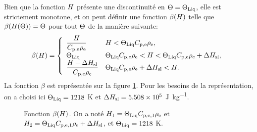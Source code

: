 Bien que la fonction $H$ présente une discontinuité en
$\Theta = \Theta_\text{Liq}$, elle est strictement monotone, et on peut
définir une fonction $\beta(H)$ telle que
$\beta(H(\Theta)) = \Theta$ pour tout
$\Theta$ de la manière suivante:
\begin{equation}\label{eq:beta}
  \beta(\enthalpy) = \left\{
  \begin{array}{ll}
    \displaystyle\frac{\enthalpy}{\electrolytehc\electrolytedensity} %
      & \enthalpy < \tliq \electrolytehc\electrolytedensity,\\
    \tliq %
      & \tliq \electrolytehc\electrolytedensity < \enthalpy < \tliq \electrolytehc\electrolytedensity + \fusionenthalpy,\\
    \displaystyle\frac{\enthalpy - \fusionenthalpy}{\electrolytehc\electrolytedensity} %
      & \tliq\electrolytehc\electrolytedensity + \fusionenthalpy < \enthalpy.\\
  \end{array}
  \right.
\end{equation}
La fonction $\beta$ est représentée sur la figure \ref{fig:beta}. Pour
les besoins de la représentation, on a choisi ici $\Theta_\text{Liq} =
\num{1218}$ \si{\kelvin} et $\Delta H_\mathrm{sl} = \num{5.508e5}$ \si{\joule\per\kilo\gram}.
\begin{figure}
  \begin{center}
    
    \caption{Fonction $\beta(H)$. On a noté $H_1 =
      \Theta_\text{Liq}C_{\mathrm{p,e,1}}\rho_\mathrm{e}$ et $H_2 =
      \Theta_\text{Liq}C_{\mathrm{p,e,1}}\rho_\mathrm{e} + \Delta H_\mathrm{sl}$, et
      $\Theta_\text{Liq} = 1218$ \si{\kelvin}.}
    \label{fig:beta}
  \end{center}
\end{figure}

